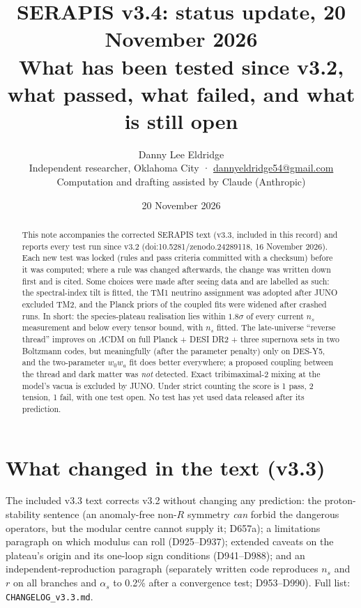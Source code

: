 \documentclass[11pt]{article}
\title{SERAPIS v3.4: status update, 20 November 2026\\[2pt]\large What has been tested since v3.2, what passed, what failed, and what is still open}
\author{Danny Lee Eldridge\\\small Independent researcher, Oklahoma City · \href{mailto:dannyeldridge54@gmail.com}{dannyeldridge54@gmail.com}\\\small Computation and drafting assisted by Claude (Anthropic)}
\date{20 November 2026}
\begin{document}
\maketitle
\begin{abstract}
This note accompanies the corrected SERAPIS text (v3.3, included in this record) and reports every test run since v3.2 (doi:10.5281/zenodo.24289118, 16 November 2026). Each new test was locked (rules and pass criteria committed with a checksum) before it was computed; where a rule was changed afterwards, the change was written down first and is cited. Some choices were made after seeing data and are labelled as such: the spectral-index tilt is fitted, the TM1 neutrino assignment was adopted after JUNO excluded TM2, and the Planck priors of the coupled fits were widened after crashed runs. In short: the species-plateau realisation lies within $1.8\sigma$ of every current $n_s$ measurement and below every tensor bound, with $n_s$ fitted. The late-universe ``reverse thread'' improves on $\Lambda$CDM on full Planck + DESI DR2 + three supernova sets in two Boltzmann codes, but meaningfully (after the parameter penalty) only on DES-Y5, and the two-parameter $w_0w_a$ fit does better everywhere; a proposed coupling between the thread and dark matter was \emph{not} detected. Exact tribimaximal-2 mixing at the model's vacua is excluded by JUNO. Under strict counting the score is 1 pass, 2 tension, 1 fail, with one test open. No test has yet used data released after its prediction.
\end{abstract}

\section{What changed in the text (v3.3)}
The included v3.3 text corrects v3.2 without changing any prediction: the proton-stability sentence (an anomaly-free non-$R$ symmetry \emph{can} forbid the dangerous operators, but the modular centre cannot supply it; D657a); a limitations paragraph on which modulus can roll (D925--D937); extended caveats on the plateau's origin and its one-loop sign conditions (D941--D988); and an independent-reproduction paragraph (separately written code reproduces $n_s$ and $r$ on all branches and $\alpha_s$ to 0.2\% after a convergence test; D953--D990). Full list: \texttt{CHANGELOG\_v3.3.md}.
\end{document}
